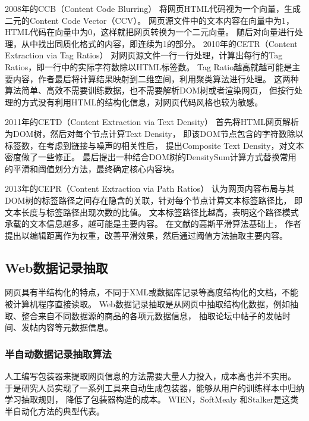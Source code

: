 2008年的CCB（Content Code Blurring）
将网页HTML代码视为一个向量，生成二元的Content Code Vector（CCV）。
网页源文件中的文本内容在向量中为1，HTML代码在向量中为0，这样就把网页转换为一个二元向量。
随后对向量进行处理，从中找出同质化格式的内容，即连续为1的部分。
2010年的CETR（Content Extraction via Tag Ratios）
对网页源文件一行一行处理，计算出每行的Tag Ratios，即一行中的实际字符数除以HTML标签数。
Tag Ratio越高就越可能是主要内容，作者最后将计算结果映射到二维空间，利用聚类算法进行处理。
这两种算法简单、高效不需要训练数据，也不需要解析DOM树或者渲染网页，
但按行处理的方式没有利用HTML的结构化信息，对网页代码风格也较为敏感。

2011年的CETD（Content Extraction via Text Density）
首先将HTML网页解析为DOM树，然后对每个节点计算Text Density，
即该DOM节点包含的字符数除以标签数，在考虑到链接与噪声的相关性后，
提出Composite Text Density，对文本密度做了一些修正。
最后提出一种结合DOM树的DensitySum计算方式替换常用的平滑和阈值划分方法，最终确定核心内容块。

2013年的CEPR（Content Extraction via Path Ratios）
认为网页内容布局与其DOM树的标签路径之间存在隐含的关联，针对每个节点计算文本标签路径比，
即文本长度与标签路径出现次数的比值。
文本标签路径比越高，表明这个路径模式承载的文本信息越多，越可能是主要内容。
在文献\cite{weninger2010cetr}的高斯平滑算法基础上，
作者提出以编辑距离作为权重，改善平滑效果，然后通过阈值方法抽取主要内容。

\subsection{Web数据记录抽取}
网页具有半结构化的特点，不同于XML或数据库记录等高度结构化的文档，不能被计算机程序直接读取。
Web数据记录抽取是从网页中抽取结构化数据，例如抽取、整合来自不同数据源的商品的各项元数据信息，
抽取论坛中帖子的发帖时间、发帖内容等元数据信息。

\subsubsection{半自动数据记录抽取算法}

人工编写包装器来提取网页信息的方法需要大量人力投入，成本高也并不实用。
于是研究人员实现了一系列工具来自动生成包装器，能够从用户的训练样本中归纳学习抽取规则，
降低了包装器构造的成本。
WIEN，SoftMealy
和Stalker是这类半自动化方法的典型代表。

